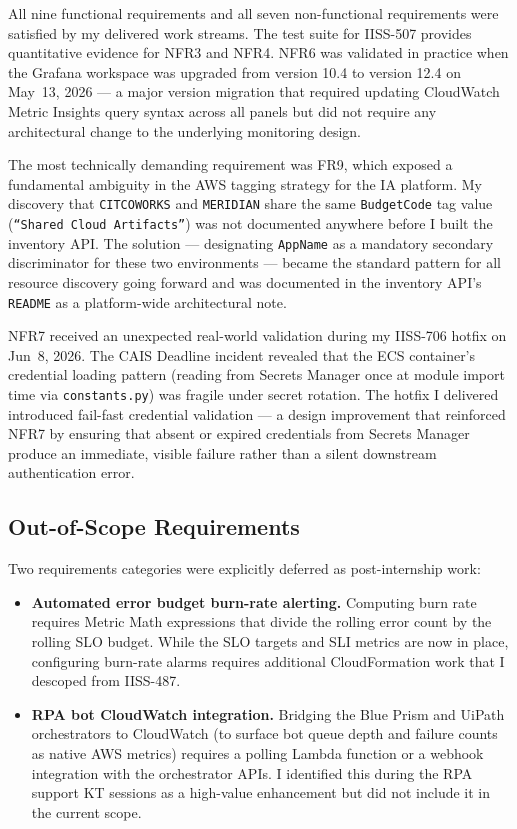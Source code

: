All nine functional requirements and all seven non-functional
requirements were satisfied by my delivered work streams. The
test suite for IISS-507 provides quantitative evidence for NFR3
and NFR4. NFR6 was validated in practice when the Grafana workspace
was upgraded from version 10.4 to version 12.4 on May~13, 2026 ---
a major version migration that required updating CloudWatch Metric
Insights query syntax across all panels but did not require any
architectural change to the underlying monitoring design.

The most technically demanding requirement was FR9, which exposed a
fundamental ambiguity in the AWS tagging strategy for the IA platform.
My discovery that \texttt{CITCOWORKS} and \texttt{MERIDIAN} share the
same \texttt{BudgetCode} tag value (\texttt{``Shared Cloud Artifacts''})
was not documented anywhere before I built the inventory API. The
solution --- designating \texttt{AppName} as a mandatory secondary
discriminator for these two environments --- became the standard pattern
for all resource discovery going forward and was documented in the
inventory API's \texttt{README} as a platform-wide architectural note.

NFR7 received an unexpected real-world validation during my
IISS-706 hotfix on Jun~8, 2026. The CAIS Deadline incident revealed
that the ECS container's credential loading pattern (reading from
Secrets Manager once at module import time via \texttt{constants.py})
was fragile under secret rotation. The hotfix I delivered introduced fail-fast
credential validation --- a design improvement that reinforced NFR7
by ensuring that absent or expired credentials from Secrets Manager
produce an immediate, visible failure rather than a silent downstream
authentication error.

\subsection{Out-of-Scope Requirements}

Two requirements categories were explicitly deferred as post-internship
work:

\begin{itemize}
    \item \textbf{Automated error budget burn-rate alerting.} Computing
          burn rate requires Metric Math expressions that divide the
          rolling error count by the rolling SLO budget. While the SLO
          targets and SLI metrics are now in place, configuring
          burn-rate alarms requires additional CloudFormation work that
          I descoped from IISS-487.

    \item \textbf{RPA bot CloudWatch integration.} Bridging the Blue
          Prism and UiPath orchestrators to CloudWatch (to surface
          bot queue depth and failure counts as native AWS metrics)
          requires a polling Lambda function or a webhook integration
          with the orchestrator APIs. I identified this during the
          RPA support KT sessions as a high-value enhancement but did
          not include it in the current scope.
\end{itemize}

